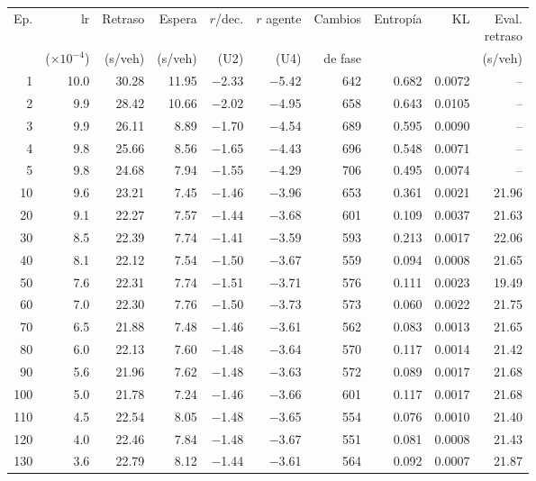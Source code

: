 \begin{table}[H]
\centering
\scriptsize
\setlength{\tabcolsep}{3pt}
\setlength{\tabcolsep}{2pt}
\begin{tabular}{rrrrrrrrrr}
\toprule
Ep. & lr & Retraso & Espera & $r$/dec. & $r$ agente & Cambios & Entropía & KL & \makecell{Eval.\\retraso} \\
 & ($\times 10^{-4}$) & (s/veh) & (s/veh) & (U2) & (U4) & de fase &  &  & (s/veh) \\
\midrule
1 & 10.0 & 30.28 & 11.95 & $-$2.33 & $-$5.42 & 642 & 0.682 & 0.0072 & -- \\
2 & 9.9 & 28.42 & 10.66 & $-$2.02 & $-$4.95 & 658 & 0.643 & 0.0105 & -- \\
3 & 9.9 & 26.11 & 8.89 & $-$1.70 & $-$4.54 & 689 & 0.595 & 0.0090 & -- \\
4 & 9.8 & 25.66 & 8.56 & $-$1.65 & $-$4.43 & 696 & 0.548 & 0.0071 & -- \\
5 & 9.8 & 24.68 & 7.94 & $-$1.55 & $-$4.29 & 706 & 0.495 & 0.0074 & -- \\
10 & 9.6 & 23.21 & 7.45 & $-$1.46 & $-$3.96 & 653 & 0.361 & 0.0021 & 21.96 \\
20 & 9.1 & 22.27 & 7.57 & $-$1.44 & $-$3.68 & 601 & 0.109 & 0.0037 & 21.63 \\
30 & 8.5 & 22.39 & 7.74 & $-$1.41 & $-$3.59 & 593 & 0.213 & 0.0017 & 22.06 \\
40 & 8.1 & 22.12 & 7.54 & $-$1.50 & $-$3.67 & 559 & 0.094 & 0.0008 & 21.65 \\
50 & 7.6 & 22.31 & 7.74 & $-$1.51 & $-$3.71 & 576 & 0.111 & 0.0023 & 19.49 \\
60 & 7.0 & 22.30 & 7.76 & $-$1.50 & $-$3.73 & 573 & 0.060 & 0.0022 & 21.75 \\
70 & 6.5 & 21.88 & 7.48 & $-$1.46 & $-$3.61 & 562 & 0.083 & 0.0013 & 21.65 \\
80 & 6.0 & 22.13 & 7.60 & $-$1.48 & $-$3.64 & 570 & 0.117 & 0.0014 & 21.42 \\
90 & 5.6 & 21.96 & 7.62 & $-$1.48 & $-$3.63 & 572 & 0.089 & 0.0017 & 21.68 \\
100 & 5.0 & 21.78 & 7.24 & $-$1.46 & $-$3.66 & 601 & 0.117 & 0.0017 & 21.68 \\
110 & 4.5 & 22.54 & 8.05 & $-$1.48 & $-$3.65 & 554 & 0.076 & 0.0010 & 21.40 \\
120 & 4.0 & 22.46 & 7.84 & $-$1.48 & $-$3.67 & 551 & 0.081 & 0.0008 & 21.43 \\
130 & 3.6 & 22.79 & 8.12 & $-$1.44 & $-$3.61 & 564 & 0.092 & 0.0007 & 21.87 \\

\end{tabular}
\end{table}
